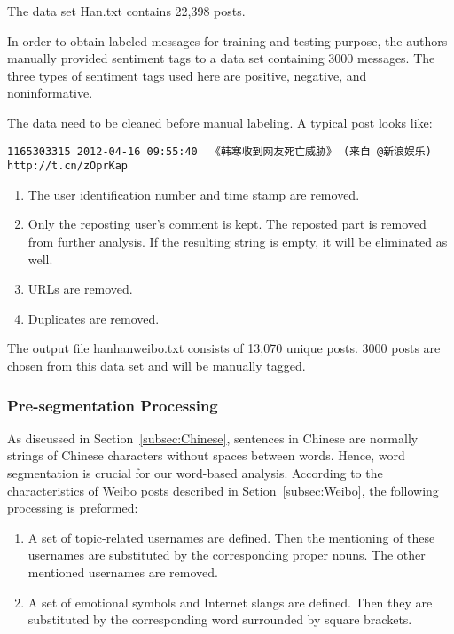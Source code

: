 \documentclass[11pt]{article}
\newcommand{\1}[1]{{\mathbf 1}\left\{#1\right\}}        %
\begin{document}
The data set {\ttfamily Han.txt} contains 22,398 posts.

In order to obtain labeled messages for training and testing purpose, the authors manually provided sentiment tags to a data set containing 3000 messages. The three types of sentiment tags used here are positive, negative, and noninformative.

The data need to be cleaned before manual labeling.
A typical post looks like:
\begin{verbatim}
1165303315 2012-04-16 09:55:40  《韩寒收到网友死亡威胁》 (来自 @新浪娱乐) http://t.cn/zOprKap
\end{verbatim}

\begin{enumerate}
\item The user identification number and time stamp are removed.
\item Only the reposting user's comment is kept. The reposted part is removed from further analysis. If the resulting string is empty, it will be eliminated as well.
\item URLs are removed.
\item Duplicates are removed.
\end{enumerate}

The output file {\ttfamily hanhanweibo.txt} consists of 13,070 unique posts. 3000 posts are chosen from this data set and will be manually tagged.



\subsubsection{Pre-segmentation Processing}

As discussed in Section~\ref{subsec:Chinese}, sentences in Chinese are normally strings of Chinese characters without spaces between words. Hence, word segmentation is crucial for our word-based analysis. According to the characteristics of Weibo posts described in Setion~\ref{subsec:Weibo}, the following processing is preformed:
\begin{enumerate}
\item A set of topic-related usernames are defined.  Then the mentioning of these usernames are substituted by the corresponding proper nouns. The other mentioned usernames are removed.
\item A set of emotional symbols and Internet slangs are defined.  Then they are substituted by the corresponding word surrounded by square brackets.
\end{enumerate}
\end{document}
